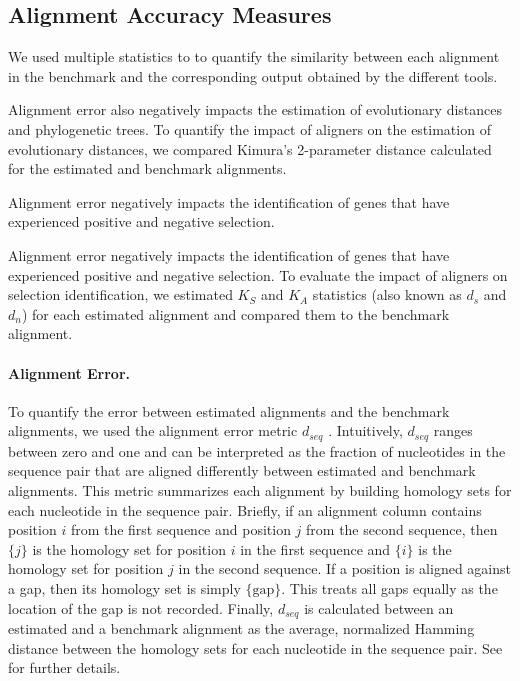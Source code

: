 \documentclass[12pt,letterpaper]{article}
\begin{document}

\subsection*{Alignment Accuracy Measures}

We used multiple statistics to to quantify the similarity between each alignment in the benchmark and the corresponding output obtained by the different tools.

Alignment error also negatively impacts the estimation of evolutionary distances and phylogenetic trees. To quantify the impact of aligners on the estimation of evolutionary distances, we compared Kimura's 2-parameter distance \citep[K2P;][]{kimura1980simple} calculated for the estimated and benchmark alignments. 

Alignment error negatively impacts the identification of genes that have experienced positive and negative selection.

Alignment error negatively impacts the identification of genes that have experienced positive and negative selection. To evaluate the impact of aligners on selection identification, we estimated $K_S$ and $K_A$ statistics (also known as $d_s$ and $d_n$) for each estimated alignment and compared them to the benchmark alignment. 

\paragraph{Alignment Error.}
To quantify the error between estimated alignments and the benchmark alignments, we used the alignment error metric $d_{seq}$ \citep{metrics_blackburne_whelan_2011}. Intuitively, $d_{seq}$ ranges between zero and one and can be interpreted as the fraction of nucleotides in the sequence pair that are aligned differently between estimated and benchmark alignments. This metric summarizes each alignment by building homology sets for each nucleotide in the sequence pair. Briefly, if an alignment column contains position $i$ from the first sequence and position $j$ from the second sequence, then $\{j\}$ is the homology set for position $i$ in the first sequence and $\{i\}$ is the homology set for position $j$ in the second sequence. If a position is aligned against a gap, then its homology set is simply $\{\text{gap}\}$. This treats all gaps equally as the location of the gap is not recorded. Finally, $d_{seq}$ is calculated  between an estimated and a benchmark alignment as the average, normalized Hamming distance between the homology sets for each nucleotide in the sequence pair. See \cite{metrics_blackburne_whelan_2011} for further details.
\end{document}
